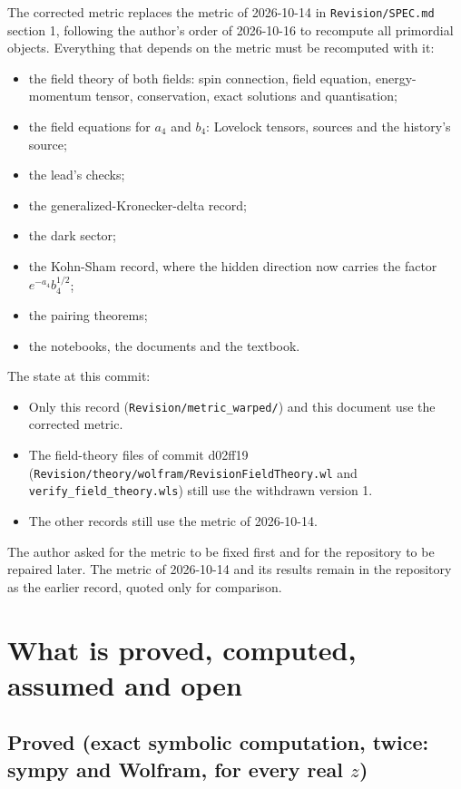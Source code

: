 \documentclass[11pt]{article}
\begin{document}
The corrected metric replaces the metric of 2026-10-14 in \texttt{Revision\allowbreak{}/SPEC.md} section 1, following the author's order of 2026-10-16 to recompute all primordial objects. Everything that depends on the metric must be recomputed with it:

\begin{itemize}
\item the field theory of both fields: spin connection, field equation, energy-momentum tensor, conservation, exact solutions and quantisation;
\item the field equations for $a_4$ and $b_4$: Lovelock tensors, sources and the history's source;
\item the lead's checks;
\item the generalized-Kronecker-delta record;
\item the dark sector;
\item the Kohn-Sham record, where the hidden direction now carries the factor $e^{-a_4}b_4^{1/2}$;
\item the pairing theorems;
\item the notebooks, the documents and the textbook.
\end{itemize}

The state at this commit:

\begin{itemize}
\item Only this record (\texttt{Revision\allowbreak{}/metric\_\allowbreak{}warped/}) and this document use the corrected metric.
\item The field-theory files of commit d02ff19 (\texttt{Revision\allowbreak{}/theory/\allowbreak{}wolfram/\allowbreak{}Revision\allowbreak{}FieldThe\allowbreak{}ory.wl} and \texttt{verify\_f\allowbreak{}ield\_the\allowbreak{}ory.wls}) still use the withdrawn version 1.
\item The other records still use the metric of 2026-10-14.
\end{itemize}

The author asked for the metric to be fixed first and for the repository to be repaired later. The metric of 2026-10-14 and its results remain in the repository as the earlier record, quoted only for comparison.

\section{What is proved, computed, assumed and open}

\subsection{Proved (exact symbolic computation, twice: sympy and Wolfram, for every real \texorpdfstring{$z$}{z})}
\end{document}
